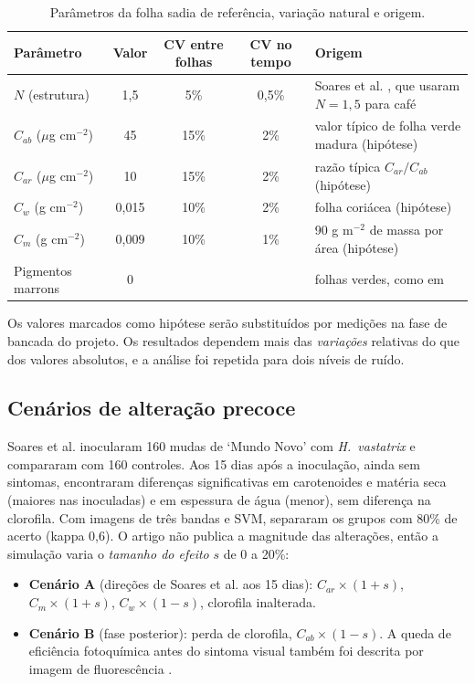 \documentclass[11pt,a4paper]{article}
\begin{document}
\begin{table}[H]\centering\footnotesize\setlength{\tabcolsep}{4pt}
\caption{Parâmetros da folha sadia de referência, variação natural e origem.}\label{tab:param}
\begin{tabular}{lcccl}\toprule
Parâmetro & Valor & CV entre folhas & CV no tempo & Origem \\\midrule
$N$ (estrutura) & 1,5 & 5\% & 0,5\% & Soares et al. \cite{soares2022}, que usaram $N=1{,}5$ para café \\
$C_{ab}$ ($\mu$g cm$^{-2}$) & 45 & 15\% & 2\% & valor típico de folha verde madura (hipótese) \\
$C_{ar}$ ($\mu$g cm$^{-2}$) & 10 & 15\% & 2\% & razão típica $C_{ar}/C_{ab}$ (hipótese) \\
$C_w$ (g cm$^{-2}$) & 0,015 & 10\% & 2\% & folha coriácea (hipótese) \\
$C_m$ (g cm$^{-2}$) & 0,009 & 10\% & 1\% & 90 g m$^{-2}$ de massa por área (hipótese) \\
Pigmentos marrons & 0 & & & folhas verdes, como em \cite{soares2022} \\\bottomrule
\end{tabular}
\end{table}
\noindent Os valores marcados como hipótese serão substituídos por medições na fase de bancada do projeto. Os resultados dependem mais das \emph{variações} relativas do que dos valores absolutos, e a análise foi repetida para dois níveis de ruído.

\subsection{Cenários de alteração precoce}
Soares et al. \cite{soares2022} inocularam 160 mudas de `Mundo Novo' com \emph{H.~vastatrix} e compararam com 160 controles. Aos 15 dias após a inoculação, ainda sem sintomas, encontraram diferenças significativas em carotenoides e matéria seca (maiores nas inoculadas) e em espessura de água (menor), sem diferença na clorofila. Com imagens de três bandas e SVM, separaram os grupos com 80\% de acerto (kappa 0,6). O artigo não publica a magnitude das alterações, então a simulação varia o \emph{tamanho do efeito} $s$ de 0 a 20\%:
\begin{itemize}
\item \textbf{Cenário A} (direções de Soares et al. aos 15 dias): $C_{ar}\times(1+s)$, $C_m\times(1+s)$, $C_w\times(1-s)$, clorofila inalterada.
\item \textbf{Cenário B} (fase posterior): perda de clorofila, $C_{ab}\times(1-s)$. A queda de eficiência fotoquímica antes do sintoma visual também foi descrita por imagem de fluorescência \cite{honorato2015}.
\end{itemize}
\end{document}
